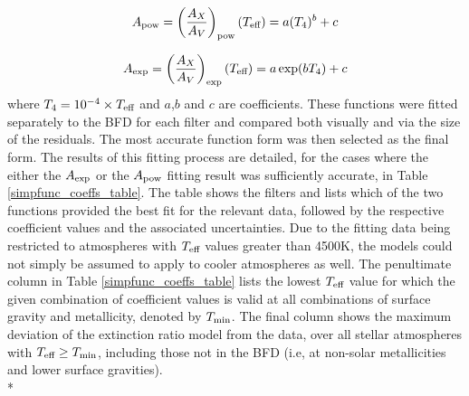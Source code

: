 \documentclass[12pt, a4paper]{report}
\begin{document}
\begin{equation}
A_{\textnormal{pow}} = \left(\frac{A_{X}}{A_{V}}\right)_{\textnormal{pow}}(T_{\textnormal{eff}}) = a (T_{4})^{b} + c
\label{Teff_pow}
\end{equation}

\begin{equation}
A_{\textnormal{exp}} = \left(\frac{A_{X}}{A_{V}}\right)_{\textnormal{exp}} (T_{\textnormal{eff}}) = a \exp(b T_{4}) + c
\label{Teff_exp}
\end{equation}
where $T_{4} = 10^{-4} \times T_{\textnormal{eff}}$ and $a$,$b$ and $c$ are coefficients. These functions were fitted separately to the BFD for each filter and compared both visually and via the size of the residuals. The most accurate function form was then selected as the final form. The results of this fitting process are detailed, for the cases where the either the $A_{\textnormal{exp}}$ or the $A_{\textnormal{pow}}$ fitting result was sufficiently accurate, in Table \ref{simpfunc_coeffs_table}. The table shows the filters and lists which of the two functions provided the best fit for the relevant data, followed by the respective coefficient values and the associated uncertainties. Due to the fitting data being restricted to atmospheres with $T_{\textnormal{eff}}$ values greater than 4500K, the models could not simply be assumed to apply to cooler atmospheres as well. The penultimate column in Table \ref{simpfunc_coeffs_table} lists the lowest $T_{\textnormal{eff}}$ value for which the given combination of coefficient values is valid at all combinations of surface gravity and metallicity, denoted by $T_{\textnormal{min}}$. The final column shows the maximum deviation of the extinction ratio model from the data, over all stellar atmospheres with $T_{\textnormal{eff}} \geq T_{\textnormal{min}}$, including those not in the BFD (i.e, at non-solar metallicities and lower surface gravities). \\*
\end{document}
